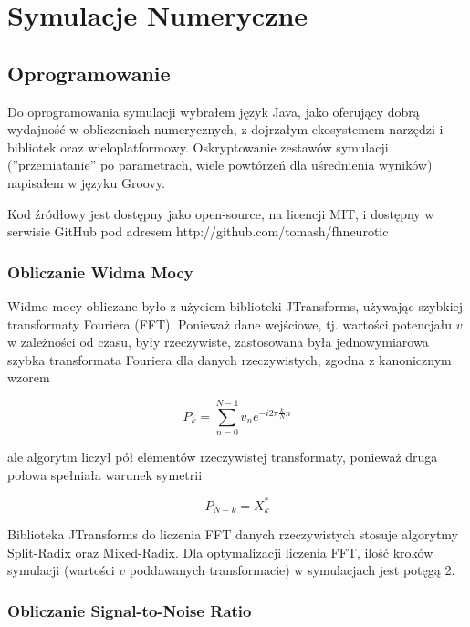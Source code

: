   \section{Symulacje Numeryczne}
  
  
  \subsection{Oprogramowanie}

  Do oprogramowania symulacji wybrałem język Java, jako oferujący dobrą wydajność w obliczeniach numerycznych, z dojrzałym ekosystemem narzędzi i bibliotek oraz wieloplatformowy. Oskryptowanie zestawów symulacji (''przemiatanie'' po parametrach, wiele powtórzeń dla uśrednienia wyników) napisałem w języku Groovy.
  
  Kod źródłowy jest dostępny jako open-source, na licencji MIT, i dostępny w serwisie GitHub pod adresem http://github.com/tomash/fhneurotic

  \subsubsection{Obliczanie Widma Mocy}

  Widmo mocy obliczane było z użyciem biblioteki JTransforms, używając szybkiej transformaty Fouriera (FFT). Ponieważ dane wejściowe, tj. wartości potencjału $v$ w zależności od czasu, były rzeczywiste, zastosowana była jednowymiarowa szybka transformata Fouriera dla danych rzeczywistych, zgodna z kanonicznym wzorem

  \begin{equation}
    P_k = \sum\limits^{N-1}_{n=0} v_n e^{-i2\pi \frac{k}{N} n}
  \end{equation}

  ale algorytm liczył pół elementów rzeczywistej transformaty, ponieważ druga połowa spełniała warunek symetrii

  \begin{equation}
    P_{N-k} = X^{*}_{k}
  \end{equation}

  Biblioteka JTransforms do liczenia FFT danych rzeczywistych stosuje algorytmy Split-Radix oraz Mixed-Radix. Dla optymalizacji liczenia FFT, ilość kroków symulacji (wartości $v$ poddawanych transformacie) w symulacjach jest potęgą 2.

  \subsubsection{Obliczanie Signal-to-Noise Ratio}

